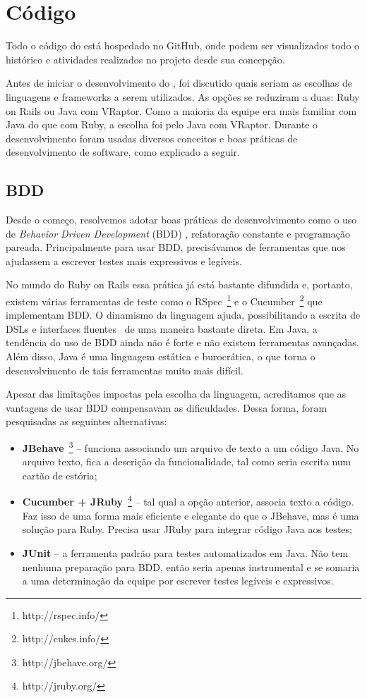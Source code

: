 \section{Código}

Todo o código do \calopsita está hospedado no GitHub, onde podem ser visualizados todo o histórico e atividades realizados no projeto desde sua concepção.

Antes de iniciar o desenvolvimento do \calopsita, foi discutido quais seriam as escolhas de linguagens e frameworks a serem utilizados. As opções se reduziram a duas: Ruby on Rails ou Java com VRaptor. Como a maioria da equipe era mais familiar com Java do que com Ruby, a escolha foi pelo Java com VRaptor. Durante o desenvolvimento foram usadas diversos conceitos e boas práticas de desenvolvimento de software, como explicado a seguir.

\subsection{BDD} 
\label{bdd}

Desde o começo, resolvemos adotar boas práticas de desenvolvimento como o uso de \textit{Behavior Driven Development} (BDD) \cite{bdd}, refatoração constante e programação pareada. Principalmente para usar BDD, precisávamos de ferramentas que nos ajudassem a escrever testes mais expressivos e legíveis. 

No mundo do Ruby on Rails essa prática já está bastante difundida e, portanto, existem várias ferramentas de teste como o RSpec~\footnote{http://rspec.info/} e o Cucumber~\footnote{http://cukes.info/} que implementam BDD. O dinamismo da linguagem ajuda, possibilitando a escrita de DSLs e interfaces fluentes~\cite{dsl} de uma maneira bastante direta. Em Java, a tendência do uso de BDD ainda não é forte e não existem ferramentas avançadas. Além disso, Java é uma linguagem estática e burocrática, o que torna o desenvolvimento de tais ferramentas muito mais difícil. 

Apesar das limitações impostas pela escolha da linguagem, acreditamos que as vantagens de usar BDD compensavam as dificuldades. Dessa forma, foram pesquisadas as seguintes alternativas:

\begin{itemize}
	\item{\textbf{JBehave}~\footnote{http://jbehave.org/} -- funciona associando um arquivo de texto a um código Java. No arquivo texto, fica a descrição da funcionalidade, tal como seria escrita num cartão de estória;}
	\item{\textbf{Cucumber + JRuby}~\footnote{http://jruby.org/} -- tal qual a opção anterior, associa texto a código. Faz isso de uma forma mais eficiente e elegante do que o JBehave, mas é uma solução para Ruby. Precisa usar JRuby para integrar código Java aos testes;}
	\item{\textbf{JUnit} -- a ferramenta padrão para testes automatizados em Java. Não tem nenhuma preparação para BDD, então seria apenas instrumental e se somaria a uma determinação da equipe por escrever testes legíveis e expressivos.}
\end{itemize}

